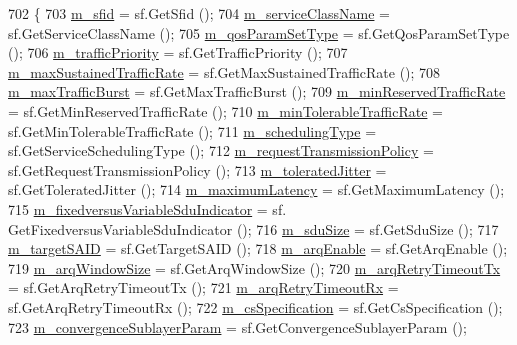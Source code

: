\begin{DoxyCode}
702 \{
703   \hyperlink{classns3_1_1ServiceFlow_ae39adff3ec14a28fc308208e56de4f82}{m\_sfid} = sf.GetSfid ();
704   \hyperlink{classns3_1_1ServiceFlow_a1edc6872551d75cf65513464475539b1}{m\_serviceClassName} = sf.GetServiceClassName ();
705   \hyperlink{classns3_1_1ServiceFlow_a76222bd599cc4e27578bafba5304d158}{m\_qosParamSetType} = sf.GetQosParamSetType ();
706   \hyperlink{classns3_1_1ServiceFlow_a536ed647361dd0cc432aec5b4a6d661a}{m\_trafficPriority} = sf.GetTrafficPriority ();
707   \hyperlink{classns3_1_1ServiceFlow_a604d5dcda6dbb58528799cf439584ecb}{m\_maxSustainedTrafficRate} = sf.GetMaxSustainedTrafficRate ();
708   \hyperlink{classns3_1_1ServiceFlow_a6d99ed08420605f4f56188eced87ccd0}{m\_maxTrafficBurst} = sf.GetMaxTrafficBurst ();
709   \hyperlink{classns3_1_1ServiceFlow_a54dc771349ed7d93631e4a44299838d7}{m\_minReservedTrafficRate} = sf.GetMinReservedTrafficRate ();
710   \hyperlink{classns3_1_1ServiceFlow_a3b8d632776a81daa9306c1e976685aee}{m\_minTolerableTrafficRate} = sf.GetMinTolerableTrafficRate ();
711   \hyperlink{classns3_1_1ServiceFlow_a2d3227119fefd7969d145645cdb693af}{m\_schedulingType} = sf.GetServiceSchedulingType ();
712   \hyperlink{classns3_1_1ServiceFlow_a019520fe5d683d8c79465830166815ce}{m\_requestTransmissionPolicy} = sf.GetRequestTransmissionPolicy ();
713   \hyperlink{classns3_1_1ServiceFlow_a225bda97e6281ab2c5a5d1b9682bf21b}{m\_toleratedJitter} = sf.GetToleratedJitter ();
714   \hyperlink{classns3_1_1ServiceFlow_a3b511a39a2dc94f5649b127c9e7a2073}{m\_maximumLatency} = sf.GetMaximumLatency ();
715   \hyperlink{classns3_1_1ServiceFlow_abcc372b51b2b646d66af51fb2231a183}{m\_fixedversusVariableSduIndicator} = sf.
      GetFixedversusVariableSduIndicator ();
716   \hyperlink{classns3_1_1ServiceFlow_ac6e5539e9c678970045eb8fe247903e6}{m\_sduSize} = sf.GetSduSize ();
717   \hyperlink{classns3_1_1ServiceFlow_a0155ea4031007c532c4a206561ec8835}{m\_targetSAID} = sf.GetTargetSAID ();
718   \hyperlink{classns3_1_1ServiceFlow_abbea8cd5abb577970a936459f71f4c07}{m\_arqEnable} = sf.GetArqEnable ();
719   \hyperlink{classns3_1_1ServiceFlow_ab160ff007191a43ea79a77d7da31d1cf}{m\_arqWindowSize} = sf.GetArqWindowSize ();
720   \hyperlink{classns3_1_1ServiceFlow_a4ec13b36ebe74498e5556ad162f001f0}{m\_arqRetryTimeoutTx} = sf.GetArqRetryTimeoutTx ();
721   \hyperlink{classns3_1_1ServiceFlow_acdaa53c3298bc50b58a06b30dabb33d2}{m\_arqRetryTimeoutRx} = sf.GetArqRetryTimeoutRx ();
722   \hyperlink{classns3_1_1ServiceFlow_a17884a9cb0e15543e8d96f8241b680ae}{m\_csSpecification} = sf.GetCsSpecification ();
723   \hyperlink{classns3_1_1ServiceFlow_a4add395bf3ab6259353e62227a88d04c}{m\_convergenceSublayerParam} = sf.GetConvergenceSublayerParam ();

\end{DoxyCode}
